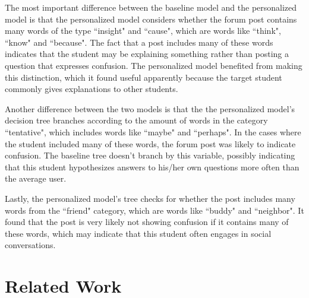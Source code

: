 \documentclass[letterpaper]{article} %
\theoremstyle{definition}
\begin{document}
The most important difference between the baseline model and the personalized model is that the personalized model considers whether the forum post contains many words of the type ``insight" and ``cause", which are words like ``think", ``know" and ``because".
The fact that a post includes many of these words indicates that the student may be explaining something rather than posting a question that expresses confusion.
The personalized model benefited from making this distinction, which it found useful apparently because the target student commonly gives explanations to other students.

Another difference between the two models is that the  the personalized model's decision tree branches according to the amount of words in the category ``tentative", which includes words like ``maybe" and ``perhaps". In the cases where the student included many of these words, the forum post was likely to indicate confusion.
The baseline tree doesn't branch by this variable, possibly indicating that this student hypothesizes answers to his/her own questions more often than the average user.

Lastly, the personalized model's tree checks for whether the post includes many words from the ``friend" category, which are words like ``buddy" and ``neighbor". It found that the post is very likely not showing confusion if it contains many of these words, which may indicate that this student often engages in social conversations.
\section{Related Work}
\end{document}
